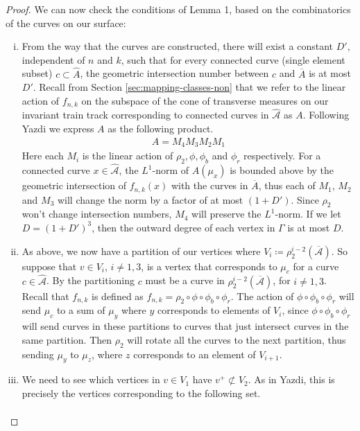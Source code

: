 \begin{proof}
We can now check the conditions of Lemma 1, based on the combinatorics of the curves on our surface:
\begin{enumerate}[(i)]
\item From the way that the curves are constructed, there will exist a constant $D'$, independent of $n$ and
  $k$, such that for every connected curve (single element subset) $c \subset \hat{A}$, the geometric
  intersection number between $c$ and $\overline{A}$ is at most $D'$.  Recall from Section
  \ref{sec:mapping-classes-non} that we refer to the linear action of $f_{n,k}$ on the subspace of the cone of
  transverse measures on our invariant train track corresponding to connected curves in $\hat{\mathcal{A}}$ as
  $A$. Following Yazdi we express $A$ as the following product.
  \begin{align*}
    A = M_4M_3M_2M_1
  \end{align*}
  Here each $M_i$ is the linear action of $\rho_2,\phi,\phi_b$ and $\phi_r$ respectively. For a connected
  curve $x \in \hat{\mathcal{A}}$, the $L^1$-norm of $A(\mu_x)$ is bounded above by the geometric intersection of
  $f_{n,k}(x)$ with the curves in $\overline{A}$, thus each of $M_1$, $M_2$ and $M_3$ will change the norm by
  a factor of at most $(1 + D')$. Since $\rho_2$ won't change intersection numbers, $M_4$ will preserve the
  $L^1$-norm. If we let $D = (1 + D')^3$, then the outward degree of each vertex in $\Gamma$ is at most $D$.
\item As above, we now have a partition of our vertices where
  $V_i \coloneqq \rho_2^{i-2}(\overline{\mathcal{A}})$. So suppose that $v \in V_i$, $i \neq 1,3$, is a vertex
  that corresponds to $\mu_c$ for a curve $c \in \hat{\mathcal{A}}$. By the partitioning $c$ must be a curve
  in $\rho_2^{i-2}(\overline{\mathcal{A}})$, for $i \neq 1,3$. Recall that $f_{n,k}$ is defined as
  $f_{n,k} = \rho_2 \circ \phi \circ \phi_b \circ \phi_r$. The action of $\phi \circ \phi_b \circ \phi_r$ will
  send $\mu_c$ to a sum of $\mu_y$ where $y$ corresponds to elements of $V_i$, since
  $\phi \circ \phi_b \circ \phi_r$ will send curves in these partitions to curves that just intersect curves
  in the same partition. Then $\rho_2$ will rotate all the curves to the next partition, thus sending $\mu_y$
  to $\mu_z$, where $z$ corresponds to an element of $V_{i+1}$.
\item We need to see which vertices in $v \in V_1$ have $v^+ \not\subset V_2$. As in Yazdi, this is precisely
  the vertices corresponding to the following set.
  \begin{align*}

\end{align*}
\end{enumerate}
\end{proof}
